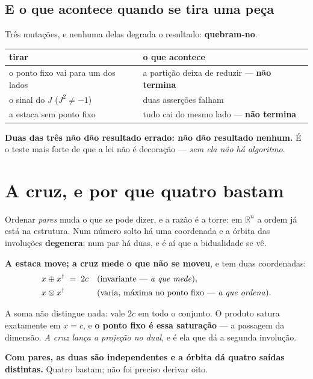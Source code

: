 \documentclass[11pt,a4paper]{article}
\begin{document}
\subsection*{E o que acontece quando se tira uma peça}

Três mutações, e nenhuma delas degrada o resultado: \textbf{quebram-no}.

\begin{center}\small
\begin{tabular}{@{}ll@{}}
\toprule
tirar & o que acontece \\
\midrule
o ponto fixo vai para um dos lados & a partição deixa de reduzir --- \textbf{não termina} \\
o sinal do $J$ ($J^{2}\neq-1$) & duas asserções falham \\
a estaca sem ponto fixo & tudo cai do mesmo lado --- \textbf{não termina} \\
\bottomrule
\end{tabular}
\end{center}

\noindent \textbf{Duas das três não dão resultado errado: não dão resultado nenhum.} É o teste mais
forte de que a lei não é decoração --- \emph{sem ela não há algoritmo}.

\section{A cruz, e por que quatro bastam}

Ordenar \emph{pares} muda o que se pode dizer, e a razão é a torre: em $\mathbb{R}^{n}$ a ordem já
está na estrutura. Num número solto há uma coordenada e a órbita das involuções \textbf{degenera};
num par há duas, e é aí que a bidualidade se vê.

\smallskip
\noindent \textbf{A estaca move; a cruz mede o que não se moveu}, e tem duas coordenadas:
\begin{align*}
  x\oplus x^{\dagger} &\;=\; 2c && \text{(invariante --- \emph{a que mede})},\\
  x\otimes x^{\dagger} & && \text{(varia, máxima no ponto fixo --- \emph{a que ordena})}.
\end{align*}

\noindent A soma não distingue nada: vale $2c$ em todo o conjunto. O produto satura exatamente em
$x=c$, e \textbf{o ponto fixo é essa saturação} --- a passagem da dimensão. \emph{A cruz lança a
projeção no dual}, e é ela que dá a segunda involução.

\smallskip
\noindent \textbf{Com pares, as duas são independentes e a órbita dá quatro saídas distintas.}
Quatro bastam; não foi preciso derivar oito.
\end{document}
